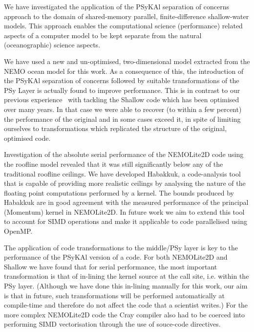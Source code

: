 \documentclass[gmdd, manuscript]{copernicus}
\begin{document}
\conclusions

We have investigated the application of the {PS}y{KA}l separation of
concerns approach to the domain of shared-memory parallel,
finite-difference shallow-water models. This approach enables the
computational science (performance) related aspects of a computer
model to be kept separate from the natural (oceanographic) science
aspects.

We have used a new and un-optimised, two-dimensional model extracted
from the NEMO ocean model for this work. As a consequence of this, the
introduction of the {PS}y{KA}l separation of concerns followed by
suitable transformations of the PSy Layer is actually found to improve
performance. This is in contrast to our previous
experience~\citep{shallow_psykal} with tackling the Shallow code which
has been optimised over many years. In that case we were able to
recover (to within a few percent) the performance of the original and
in some cases exceed it, in spite of limiting ourselves to
transformations which replicated the structure of the original,
optimised code.

Investigation of the absolute serial performance of the NEMOLite2D
code using the roofline model revealed that it was still significantly
below any of the traditional roofline ceilings. We have developed
Habakkuk, a code-analysis tool
that is capable of providing more realistic ceilings by analysing the
nature of the floating point computations performed by a kernel. The
bounds produced by Habakkuk are in good agreement with the measured
performance of the principal (Momentum) kernel in NEMOLite2D. In
future work we aim to extend this tool to account for SIMD operations
and make it applicable to code parallelised using OpenMP.

The application of code transformations to the middle/PSy layer is key
to the performance of the {PS}y{KA}l version of a code. For both
NEMOLite2D and Shallow we have found that for serial performance, the
most important transformation is that of in-lining the kernel source
at the call site, i.e. within the PSy layer. (Although we have done
this in-lining manually for this work, our aim is that in future, such
transformations will be performed automatically at compile-time and
therefore do not affect the code that a scientist writes.)
For the more complex NEMOLite2D code the Cray compiler also
had to be coerced into performing SIMD vectorisation through the use
of souce-code directives.
\end{document}
